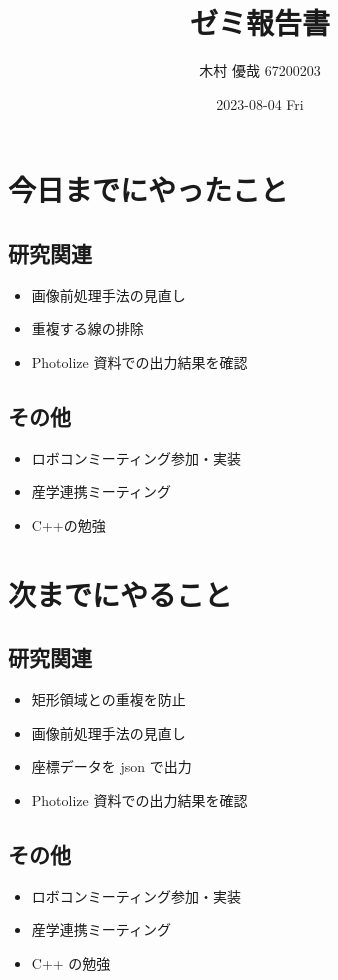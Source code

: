\documentclass[uplatex, onecolumn, 10pt]{jsarticle}
\begin{document}
\title{\vspace{-40mm}\bf{\LARGE{ゼミ報告書}}}
\author{\vspace{-40mm}木村 優哉 67200203}
\date{2023-08-04 Fri}
\maketitle


\section{今日までにやったこと}

\subsection*{研究関連}
\begin{itemize}
	\item 画像前処理手法の見直し
	\item 重複する線の排除
	\item Photolize 資料での出力結果を確認
\end{itemize}

\subsection*{その他}
\begin{itemize}
	\item ロボコンミーティング参加・実装
	\item 産学連携ミーティング
	\item C++の勉強
\end{itemize}


\section{次までにやること}

\subsection*{研究関連}
\begin{itemize}
	\item 矩形領域との重複を防止
	\item 画像前処理手法の見直し
	\item 座標データを json で出力
	\item Photolize 資料での出力結果を確認
\end{itemize}

\subsection*{その他}
\begin{itemize}
	\item ロボコンミーティング参加・実装
	\item 産学連携ミーティング
	\item C++ の勉強
\end{itemize}
\end{document}
